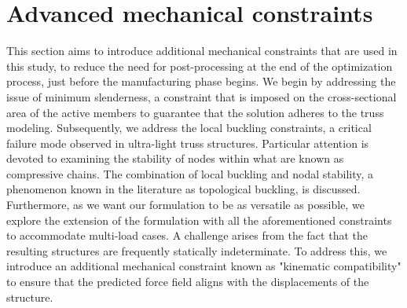 \section{Advanced mechanical constraints} \label{sec:04_constr}
This section aims to introduce additional mechanical constraints that are used in this study, to reduce the need for post-processing at the end of the optimization process, just before the manufacturing phase begins. We begin by addressing the issue of minimum slenderness, a constraint that is imposed on the cross-sectional area of the active members to guarantee that the solution adheres to the truss modeling. Subsequently, we address the local buckling constraints, a critical failure mode observed in ultra-light truss structures. Particular attention is devoted to examining the stability of nodes within what are known as compressive chains. The combination of local buckling and nodal stability, a phenomenon known in the literature as topological buckling, is discussed. Furthermore, as we want our formulation to be as versatile as possible, we explore the extension of the formulation with all the aforementioned constraints to accommodate multi-load cases. A challenge arises from the fact that the resulting structures are frequently statically indeterminate. To address this, we introduce an additional mechanical constraint known as "kinematic compatibility" to ensure that the predicted force field aligns with the displacements of the structure.


